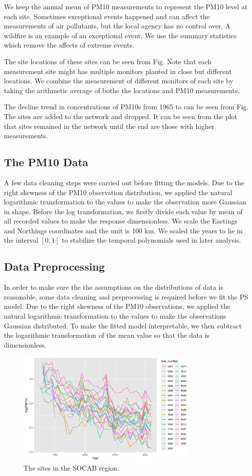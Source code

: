 We keep the annual mean of PM10 measurements to represent the PM10 level at each site.
Sometimes exceptional events happened and can affect the measurements of air pollutants, 
but the local agency has no control over. A wildfire is an example of an exceptional event. 
We use the summary statistics which remove the affects of extreme events.  

The site locations of these sites can be seen from Fig. Note that each measurement site might has 
multiple monitors planted in close but different locations. We combine the measurement of different
monitors of each site by taking the arithmetic average of bothe the locations and PM10 measurements.

The decline trend in concentrations of PM10s from 1965 to can be seen from Fig. The sites are added 
to the network and dropped. It can be seen from the plot that sites remained in the network until 
the end are those with higher measurements.
\subsection{The PM10 Data}
A few data cleaning steps were carried out before fitting the models. Due to the right skewness of 
the PM10 observation distribution, we applied the natural logarithmic transformation to the values
to make the observation more Gaussian in shape. Before the log transformation, we firstly divide
each value by mean of all recorded values to make the response dimensionless.
We scale the Eastings and Northings coordinates and the unit is 100 km. We scaled the years to
lie in the interval $[0, 1]$ to stabilize the temporal polynomials used in later analysis.

\subsection{Data Preprocessing}
In order to make sure the the assumptions on the distributions of data is reasonable, some data
cleaning and preprocessing is required before we fit the PS model. Due to the right skewness of the
PM10 observations, we applied the natural logarithmic transformation to the values to make the 
observations Gaussian distributed. To make the fitted model interpretable, we then subtract the 
logarithmic transformation of the mean value so that the data is dimensionless. 
\begin{figure}[ht]
	\centering
	\includegraphics[width = 0.8\textwidth]{socab_plots/logPM10_traces.png}
	\caption{The sites in the SOCAB region.}
	\label{fig:logpm10_traces}
\end{figure}

